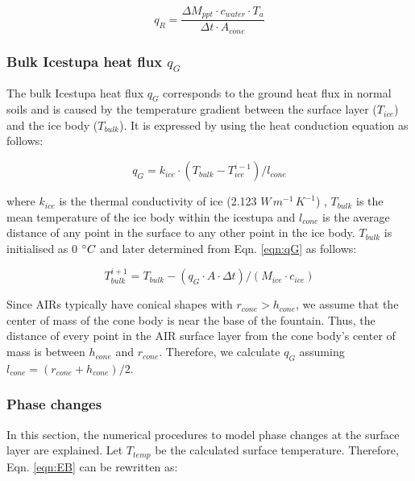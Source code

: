 \begin{equation}
  q_{R} = \frac{ \Delta M_{ppt} \cdot c_{water} \cdot T_a}{\Delta t \cdot A_{cone}}
	\label{eqn:qR}
\end{equation}

\subsubsection{Bulk Icestupa heat flux \texorpdfstring{$q_{G}$}{Lg}} \label{sec:Bulkflux}

The bulk Icestupa heat flux $q_{G}$ corresponds to the ground heat flux in normal soils and is caused by the
temperature gradient between the surface layer ($T_{ice}$) and the ice body ($T_{bulk}$). It is expressed by
using the heat conduction equation as follows:

\begin{equation} q_{G} = k_{ice} \cdot (T_{bulk}-T_{ice}^{i-1})/l_{cone} \label{eqn:qG}    \end{equation}

where $k_{ice}$ is the thermal conductivity of ice (2.123 $W\, m^{-1}\,K^{-1}$) , $T_{bulk}$ is the mean
temperature of the ice body within the icestupa and $l_{cone}$ is the average distance of any point in the
surface to any other point in the ice body. $T_{bulk}$ is initialised as 0 $^{\circ} C$ and later determined from
Eqn. \ref{eqn:qG} as follows:

\begin{equation} T_{bulk}^{i+1} = T_{bulk} - (q_{G} \cdot A \cdot \Delta t)/(M_{ice} \cdot c_{ice}) \end{equation}

Since \ac{AIRs} typically have conical shapes with $r_{cone} > h_{cone}$, we assume that the center of mass of the cone
body is near the base of the fountain. Thus, the distance of every point in the AIR surface layer from the cone
body's center of mass is between $h_{cone}$ and $r_{cone}$. Therefore, we calculate $q_{G}$ assuming $l_{cone} = (r_{cone} +
	h_{cone})/2$.

\subsubsection{Phase changes}\label{sec:phase}

In this section, the numerical procedures to model phase changes at the surface layer are explained. Let
$T_{temp}$ be the calculated surface temperature. Therefore, Eqn. \ref{eqn:EB} can be rewritten as:

